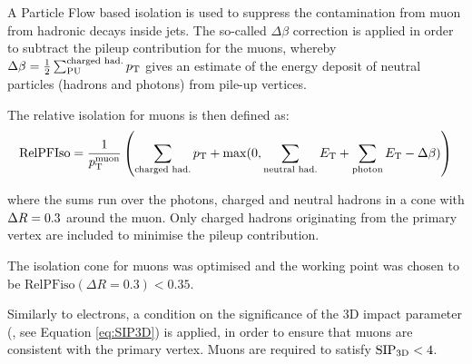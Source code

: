 A Particle Flow based isolation is used to suppress the contamination from muon from hadronic decays inside jets.
The so-called $\Delta\beta$ correction is applied in order to subtract the pileup contribution for the muons, 
whereby $\Delta\beta = \frac{1}{2} \sum^\text{charged had.}_\text{PU} p_{\mathrm{T}}$ gives an estimate of the energy deposit of neutral particles (hadrons and photons) from pile-up vertices.

The relative isolation for muons is then defined as:
\begin{equation}
\text{RelPFIso} = \frac{1}{p_{\mathrm{T}}^\text{muon}} \left( \sum_\text{charged had.} p_{\mathrm{T}} + \max(0, \sum_\text{neutral had.} E_{\mathrm{T}} + \sum_\text{photon} E_{\mathrm{T}} - \Delta \beta) \right)
\label{eqn:mupfiso}
\end{equation}

where the sums run over the photons, charged and neutral hadrons in a cone with $\Delta R = 0.3$ around the muon.
Only charged hadrons originating from the primary vertex are included to minimise the pileup contribution.

The isolation cone for muons was optimised and the working point was chosen to be $\text{RelPFiso}(\Delta R = 0.3) < 0.35$. 

Similarly to electrons, a condition on the significance of the 3D impact parameter (\SIPthreeD, see Equation \ref{eq:SIP3D}) is applied,
in order to ensure that muons are consistent with the primary vertex.
Muons are required to satisfy $\mathrm{SIP}_{\mathrm{3D}} < 4$.
